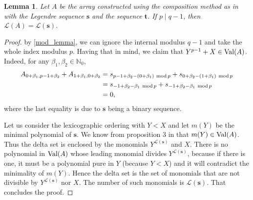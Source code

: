 \documentclass[12pt]{article}
\renewcommand{\mod}{\ \textup{mod}\,}
\newcommand{\val}{\textup{Val}}
\newcommand{\legendre}{\mathscr{L}(\mathbf{s})}
\newtheorem{lemma}[theorem]{Lemma}
\theoremstyle{definition}
\theoremstyle{definition}
\theoremstyle{definition}
\theoremstyle{plain}
\theoremstyle{plain}
\numberwithin{equation}{section}
\begin{document}
\begin{lemma}
    Let $A$ be the array constructed using the composition method as in  with the Legendre sequence $\mathbf{s}$ and the sequence $\mathbf{t}$. 
    If $p \mid q-1$, then $\mathscr{L}(A) = \legendre$.
\end{lemma}
\begin{proof}
    by \cref{mod_lemma}, we can ignore the internal modulus $q-1$ and take the whole index modulus $p$.
    Having that in mind, we claim that $Y^{p-1}+X \in \val(A)$. 
    Indeed, for any $\beta_1, \beta_2 \in \mathbb{N}_0$,
    \begin{align*}
        A_{0+\beta_1, p-1+\beta_2} + A_{1+\beta_1, 0+\beta_2} 
        &= s_{p-1+\beta_2 - (0+\beta_1) \mod p} + s_{0+\beta_2 - (1+\beta_1) \mod p}\\
        &= s_{-1+\beta_2 - \beta_1 \mod p} + s_{-1 + \beta_2 - \beta_1 \mod p}\\
        &= 0,
    \end{align*}
    where the last equality is due to $\mathbf{s}$ being a binary sequence.
    
    Let us consider the lexicographic ordering with $Y<X$ and let $m(Y)$ be the minimal polynomial of $\mathbf{s}$. 
    We know from proposition 3 in \cite{arce2019multidimensional} that $m(Y)\in\val(A)$.
    Thus the delta set is enclosed by the monomials $Y^{\legendre}$ and $X$. 
    There is no polynomial in $\val(A)$ whose leading monomial divides $Y^{\legendre}$, because if there is one, it must be a polynomial pure in $Y$ (because $Y<X$) and it will contradict the minimality of $m(Y)$. 
    Hence the delta set is the set of monomials that are not divisible by $Y^{\legendre}$ nor $X$. 
    The number of such monomials is $\legendre$. 
    That concludes the proof.
\end{proof}
\end{document}
